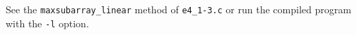 See the \texttt{maxsubarray\_linear} method of \texttt{e4\_1-3.c} or run the compiled program with the \texttt{-l} option.
